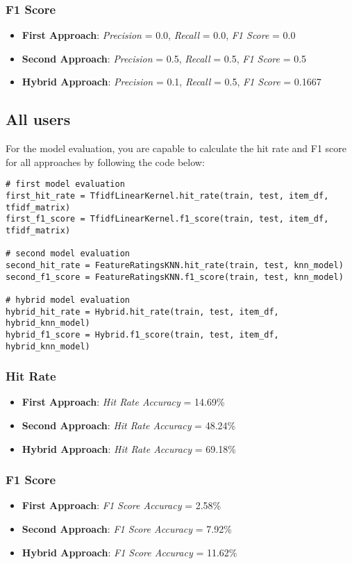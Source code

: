 \subsubsection{F1 Score}

\begin{itemize}
    \item \textbf{First Approach}: \textit{Precision} = 0.0, \textit{Recall} = 0.0, \textit{F1 Score} = 0.0
    \item \textbf{Second Approach}: \textit{Precision} = 0.5, \textit{Recall} = 0.5, \textit{F1 Score} = 0.5
    \item \textbf{Hybrid Approach}: \textit{Precision} = 0.1, \textit{Recall} = 0.5, \textit{F1 Score} = 0.1667
\end{itemize}

\subsection{All users}

For the model evaluation, you are capable to calculate the hit rate and F1 score 
for all approaches by following the code below:

\begin{verbatim}
# first model evaluation
first_hit_rate = TfidfLinearKernel.hit_rate(train, test, item_df, tfidf_matrix)
first_f1_score = TfidfLinearKernel.f1_score(train, test, item_df, tfidf_matrix)

# second model evaluation
second_hit_rate = FeatureRatingsKNN.hit_rate(train, test, knn_model)
second_f1_score = FeatureRatingsKNN.f1_score(train, test, knn_model)

# hybrid model evaluation
hybrid_hit_rate = Hybrid.hit_rate(train, test, item_df, hybrid_knn_model)
hybrid_f1_score = Hybrid.f1_score(train, test, item_df, hybrid_knn_model)
\end{verbatim}

\subsubsection{Hit Rate}

\begin{itemize}
    \item \textbf{First Approach}: \textit{Hit Rate Accuracy} = 14.69\%
    \item \textbf{Second Approach}: \textit{Hit Rate Accuracy} = 48.24\%
    \item \textbf{Hybrid Approach}: \textit{Hit Rate Accuracy} = 69.18\%
\end{itemize}

\subsubsection{F1 Score}

\begin{itemize}
    \item \textbf{First Approach}: \textit{F1 Score Accuracy} = 2.58\%
    \item \textbf{Second Approach}: \textit{F1 Score Accuracy} = 7.92\%
    \item \textbf{Hybrid Approach}: \textit{F1 Score Accuracy} = 11.62\%
\end{itemize}